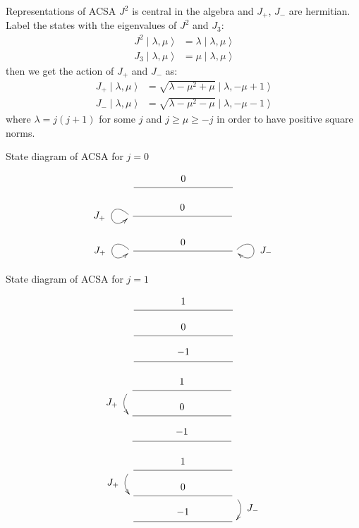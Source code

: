 \documentclass[pdf,colorBG,slideColor,fyma]{prosper}
\newcommand{\ket}[1]{\mid #1\;\rangle}
\begin{document}

\begin{slide}{Representations of ACSA}
$J^2$ is central in the algebra and $J_+$, $J_-$ are hermitian.
\break
\break
Label the states with the eigenvalues of $J^2$ and $J_3$:
\begin{align*}
J^2 \ket{\lambda, \mu} & = \lambda \ket{\lambda, \mu} \\
J_3 \ket{\lambda, \mu} & = \mu \ket{\lambda, \mu}
\end{align*}
then we get the action of $J_+$ and $J_-$ as:
\begin{align*}
J_+ \ket{\lambda, \mu} & = \sqrt{\lambda - \mu^2 + \mu} \ket{\lambda,- \mu + 1} \\
J_- \ket{\lambda, \mu} & = \sqrt{\lambda - \mu^2 - \mu} \ket{\lambda,- \mu - 1}
\end{align*}
where $\lambda = j(j+1)$ for some $j$ and $j \geq \mu \geq -j$ in order to have positive
square norms.
\end{slide}


 {
\begin{slide}{State diagram of ACSA for $j=0$}
{
  \[
  \xymatrix@R=20pt@C=100pt{
    \ar@{}[] \ar@{-}[r]^-*+{0} & \ar@{}[]
  }
  \]
}
{
  \[
  \xymatrix@R=20pt@C=100pt{
    \ar@(ul,dl)[]_*+{J_+} \ar@{-}[r]^-*+{0} & \ar@{}[]\hspace{42pt}
  }
  \]
}
{
  \[
  \xymatrix@R=20pt@C=100pt{
    \ar@(ul,dl)[]_*+{J_+} \ar@{-}[r]^-*+{0} & \ar@(ur,dr)[]^*+{J_-}
  }
  \]
}
\end{slide}
}
 {
\begin{slide}{State diagram of ACSA for $j=1$}
{
  \[
  \xymatrix@R=20pt@C=100pt{
    \ar@{}[d] \ar@{-}[r]^-*+{1} & \\
    \ar@{-}[r]^-*+{0} & \ar@{}[d] \\
    \ar@{-}[r]^-*+{-1} &  \\
  }
  \]
}
{
  \[
  \xymatrix@R=20pt@C=100pt{
    \ar@/_/[d]_*+{J_+} \ar@{-}[r]^-*+{1} & \hspace{30pt}\\
    \ar@{-}[r]^-*+{0} & \ar@{}[d]\hspace{30pt} \\
    \ar@{-}[r]^-*+{-1} &  \hspace{30pt}\\
  }
  \]
}
{
  \[
  \xymatrix@R=20pt@C=100pt{
    \ar@/_/[d]_*+{J_+} \ar@{-}[r]^-*+{1} & \\
    \ar@{-}[r]^-*+{0} & \ar@/^/[d]^*+{J_-} \\
    \ar@{-}[r]^-*+{-1} &  \\
  }
  \]
}
\end{slide}
}
\end{document}
